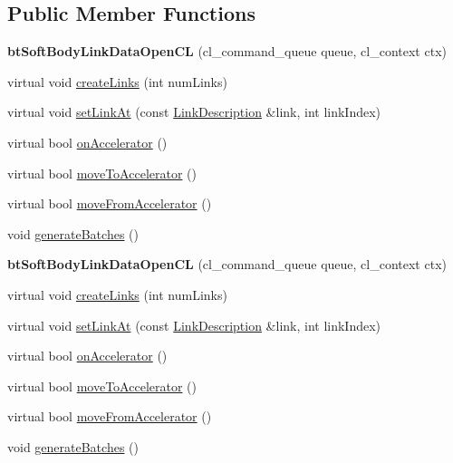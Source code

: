 \subsection*{Public Member Functions}
\begin{DoxyCompactItemize}
\item 
\mbox{\label{classbtSoftBodyLinkDataOpenCL_aaf61e26102150c1ea457e8cfdce51ba8}} 
{\bfseries bt\+Soft\+Body\+Link\+Data\+Open\+CL} (cl\+\_\+command\+\_\+queue queue, cl\+\_\+context ctx)
\item 
virtual void \hyperlink{classbtSoftBodyLinkDataOpenCL_a3ebb411d58ecebab84e391588f20204f}{create\+Links} (int num\+Links)
\item 
virtual void \hyperlink{classbtSoftBodyLinkDataOpenCL_abef476a18a102fffd4dbb73ca2cfb9a4}{set\+Link\+At} (const \hyperlink{classbtSoftBodyLinkData_1_1LinkDescription}{Link\+Description} \&link, int link\+Index)
\item 
virtual bool \hyperlink{classbtSoftBodyLinkDataOpenCL_a3e97987329d5a5e7a4a51523fa9d4651}{on\+Accelerator} ()
\item 
virtual bool \hyperlink{classbtSoftBodyLinkDataOpenCL_a6957608260f4a848712de1ad0b8f863f}{move\+To\+Accelerator} ()
\item 
virtual bool \hyperlink{classbtSoftBodyLinkDataOpenCL_a47cc8710e80d8e3d00775960c358058d}{move\+From\+Accelerator} ()
\item 
void \hyperlink{classbtSoftBodyLinkDataOpenCL_a4e968e65bfa4b5b1691a83fdee3ce48f}{generate\+Batches} ()
\item 
\mbox{\label{classbtSoftBodyLinkDataOpenCL_aaf61e26102150c1ea457e8cfdce51ba8}} 
{\bfseries bt\+Soft\+Body\+Link\+Data\+Open\+CL} (cl\+\_\+command\+\_\+queue queue, cl\+\_\+context ctx)
\item 
virtual void \hyperlink{classbtSoftBodyLinkDataOpenCL_acc44e1a0b702ca17a5185d39e47f9b05}{create\+Links} (int num\+Links)
\item 
virtual void \hyperlink{classbtSoftBodyLinkDataOpenCL_a4602606fdbcaa6cd2a976c71f7582398}{set\+Link\+At} (const \hyperlink{classbtSoftBodyLinkData_1_1LinkDescription}{Link\+Description} \&link, int link\+Index)
\item 
virtual bool \hyperlink{classbtSoftBodyLinkDataOpenCL_a6cd4ec2a4127d48feff5c2cb46be5d52}{on\+Accelerator} ()
\item 
virtual bool \hyperlink{classbtSoftBodyLinkDataOpenCL_a5e820163521c0848b6b4f025add87213}{move\+To\+Accelerator} ()
\item 
virtual bool \hyperlink{classbtSoftBodyLinkDataOpenCL_a67152548f633d131fbdb33d323f701db}{move\+From\+Accelerator} ()
\item 
void \hyperlink{classbtSoftBodyLinkDataOpenCL_a4e968e65bfa4b5b1691a83fdee3ce48f}{generate\+Batches} ()
\end{DoxyCompactItemize}
